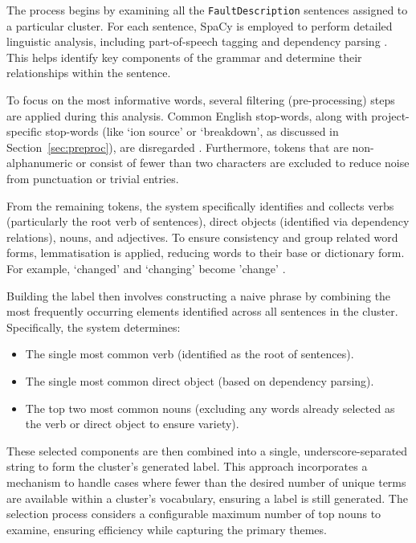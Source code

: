 \documentclass[10pt,oneside]{report}
\begin{document}
The process begins by examining all the \texttt{FaultDescription} sentences assigned to a particular cluster. For each sentence, SpaCy is employed to perform detailed linguistic analysis, including part-of-speech tagging and dependency parsing \cite{tabassum2020survey}. This helps identify key components of the grammar and determine their relationships within the sentence.

To focus on the most informative words, several filtering (pre-processing) steps are applied during this analysis. Common English stop-words, along with project-specific stop-words (like `ion source' or `breakdown', as discussed in Section~\ref{sec:preproc}), are disregarded \cite{tabassum2020survey}. Furthermore, tokens that are non-alphanumeric or consist of fewer than two characters are excluded to reduce noise from punctuation or trivial entries.

From the remaining tokens, the system specifically identifies and collects verbs (particularly the root verb of sentences), direct objects (identified via dependency relations), nouns, and adjectives. To ensure consistency and group related word forms, lemmatisation is applied, reducing words to their base or dictionary form. For example, `changed' and `changing' become 'change' \cite{tabassum2020survey}.

Building the label then involves constructing a naive phrase by combining the most frequently occurring elements identified across all sentences in the cluster. Specifically, the system determines:
\begin{itemize}
    \item The single most common verb (identified as the root of sentences).
    \item The single most common direct object (based on dependency parsing).
    \item The top two most common nouns (excluding any words already selected as the verb or direct object to ensure variety).
\end{itemize}

These selected components are then combined into a single, underscore-separated string to form the cluster's generated label. This approach incorporates a mechanism to handle cases where fewer than the desired number of unique terms are available within a cluster's vocabulary, ensuring a label is still generated. The selection process considers a configurable maximum number of top nouns to examine, ensuring efficiency while capturing the primary themes.
\end{document}
